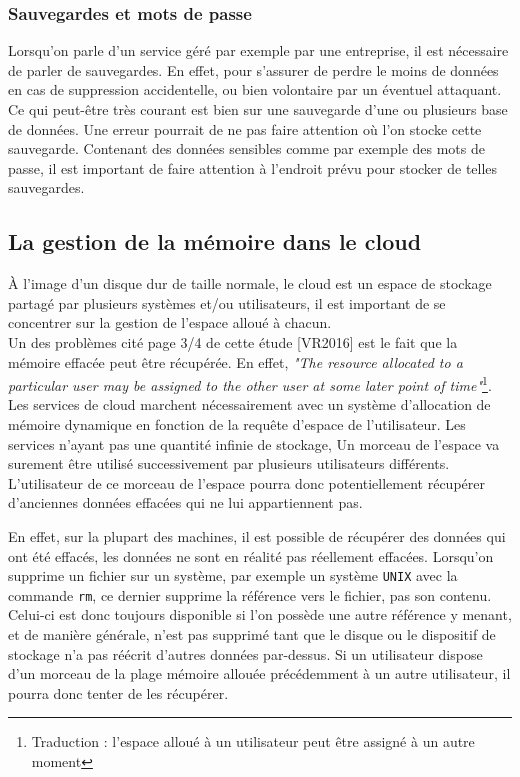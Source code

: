 \documentclass[a4paper, 12pt]{article}
\begin{document}
\begin{spacing}{1.1}
      \subsubsection{Sauvegardes et mots de passe}
        Lorsqu'on parle d'un service géré par exemple par une entreprise, il est
        nécessaire de parler de sauvegardes. En effet, pour s'assurer de perdre
        le moins de données en cas de suppression accidentelle, ou bien
        volontaire par un éventuel attaquant. Ce qui peut-être très courant est
        bien sur une sauvegarde d'une ou plusieurs base de données. Une erreur
        pourrait de ne pas faire attention où l'on stocke cette sauvegarde.
        Contenant des données sensibles comme par exemple des mots de passe,
        il est important de faire attention à l'endroit prévu pour stocker de
        telles sauvegardes.

    \subsection{La gestion de la mémoire dans le cloud}
      À l'image d'un disque dur de taille normale, le cloud est un espace de
      stockage partagé par plusieurs systèmes et/ou utilisateurs, il est
      important de se concentrer sur la gestion de l'espace alloué à chacun. \\

      Un des problèmes cité page 3/4 de cette étude [VR2016] est le fait que la
      mémoire effacée peut être récupérée. En effet, \textit{"The resource
      allocated to a particular user may be assigned to the other user at some
      later point of time"}\footnote{Traduction : l'espace alloué à un
      utilisateur peut être assigné à un autre moment}. Les services de cloud
      marchent nécessairement avec un système d'allocation de mémoire dynamique
      en fonction de la requête d'espace de l'utilisateur. Les services n'ayant
      pas une quantité infinie de stockage, Un morceau de l'espace va surement
      être utilisé successivement par plusieurs utilisateurs différents.
      L'utilisateur de ce morceau de l'espace pourra donc potentiellement
      récupérer d'anciennes données effacées qui ne lui appartiennent pas.

      En effet, sur la plupart des machines, il est possible de récupérer des
      données qui ont été effacés, les données ne sont en réalité pas réellement
      effacées. Lorsqu'on supprime un fichier sur un système, par exemple un
      système \verb+UNIX+ avec la commande \verb+rm+, ce dernier supprime la
      référence vers le fichier, pas son contenu. Celui-ci est donc toujours
      disponible si l'on possède une autre référence y menant, et de manière
      générale, n'est pas supprimé tant que le disque ou le dispositif de
      stockage n'a pas réécrit d'autres données par-dessus. Si un utilisateur
      dispose d'un morceau de la plage mémoire allouée précédemment à un autre
      utilisateur, il pourra donc tenter de les récupérer.


\end{spacing}
\end{document}
